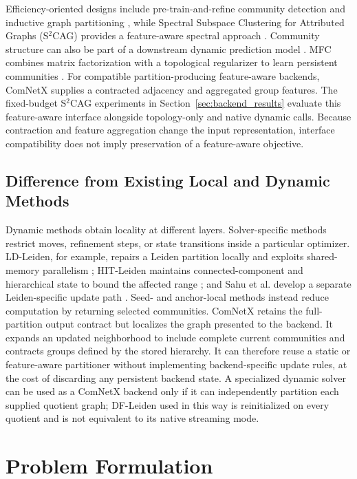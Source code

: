 \documentclass{ieeeaccess}
\begin{document}
Efficiency-oriented designs include pre-train-and-refine community detection
and inductive graph partitioning \cite{Qin2024PretrainRefine,Qin2024PRGPT},
while Spectral Subspace Clustering for Attributed Graphs (S$^2$CAG) provides a
feature-aware spectral approach \cite{Lin2025S2CAG}. Community structure can
also be part of a downstream
dynamic prediction model \cite{Ji2023DynamicPopularity}. MFC combines matrix
factorization with a topological regularizer to learn persistent communities
\cite{Kong2024MFC}. For compatible partition-producing feature-aware backends,
ComNetX supplies a contracted adjacency and aggregated group features. The
fixed-budget
S$^2$CAG experiments in Section~\ref{sec:backend_results} evaluate this
feature-aware interface alongside topology-only and native dynamic calls.
Because contraction and feature aggregation change the input representation,
interface compatibility does not imply preservation of a feature-aware
objective.

\subsection{Difference from Existing Local and Dynamic Methods}

Dynamic methods obtain locality at different layers. Solver-specific methods
restrict moves, refinement steps, or state transitions inside a particular
optimizer. LD-Leiden, for example, repairs a Leiden partition locally and
exploits shared-memory parallelism
\cite{Bokov2026LDLeiden}; HIT-Leiden maintains connected-component and
hierarchical state to bound the affected range \cite{Lin2026HITLeiden}; and
Sahu et al. develop a separate Leiden-specific
update path \cite{Sahu2024Start}. Seed- and
anchor-local methods instead reduce computation by returning selected
communities. ComNetX retains the full-partition output contract but localizes
the graph presented to the backend. It expands an updated neighborhood to
include complete current communities and contracts groups defined by the
stored hierarchy. It can therefore reuse a static or feature-aware partitioner
without implementing backend-specific update rules, at the cost of discarding
any persistent backend state. A specialized dynamic solver can be used as a
ComNetX backend only if it can independently partition each supplied quotient
graph; DF-Leiden used in this way is reinitialized on every quotient and is not
equivalent to its native streaming mode.

\section{Problem Formulation}
\label{sec:problem}
\end{document}
